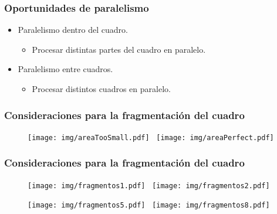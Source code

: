\documentclass[11pt,a4paper,spanish]{beamer}
\begin{document}
\begin{frame}

\frametitle{Oportunidades de paralelismo}

\begin{itemize}

	\item Paralelismo dentro del cuadro.
		
\begin{itemize}

	\item Procesar distintas partes del cuadro en paralelo.

\end{itemize}

	\item Paralelismo entre cuadros.

\begin{itemize}

	\item Procesar distintos cuadros en paralelo.

\end{itemize}

\end{itemize}

\end{frame}

\begin{frame}

\frametitle{Consideraciones para la fragmentación del cuadro}

\begin{figure}[h]

	\centering
	
	\texttt{[image: img/areaTooSmall.pdf]}~
	\texttt{[image: img/areaPerfect.pdf]}

\end{figure}

\end{frame}

\begin{frame}

\frametitle{Consideraciones para la fragmentación del cuadro}

\begin{figure}[h]

	\texttt{[image: img/fragmentos1.pdf]}~
	\texttt{[image: img/fragmentos2.pdf]}

	\texttt{[image: img/fragmentos5.pdf]}~
	\texttt{[image: img/fragmentos8.pdf]}

\end{figure}

\end{frame}
\end{document}
